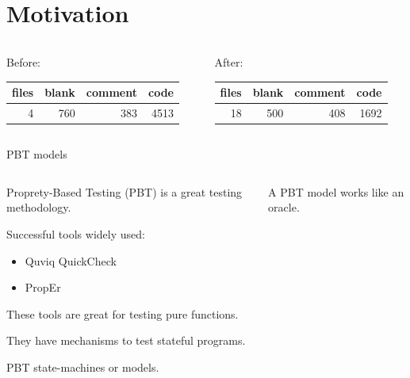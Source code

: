 \documentclass[aspectratio=169, 10pt, handout]{beamer}
\begin{document}
\whitetheme

\section{Motivation}
\label{sec:org83b7ca0}
\begin{frame}[label={sec:orgbdadd48}]{}
\begin{columns}
\begin{column}{0.38\columnwidth}
Before:
\begin{center}
\begin{tabular}{rrrr}
files & blank & comment & code\\
\hline
4 & 760 & 383 & 4513\\
\end{tabular}
\end{center}
\end{column}
\begin{column}{0.38\columnwidth}
After:
\begin{center}
\begin{tabular}{rrrr}
files & blank & comment & code\\
\hline
18 & 500 & 408 & 1692\\
\end{tabular}
\end{center}
\end{column}
\end{columns}
\end{frame}

\begin{frame}[label={sec:org3379b2c}]{PBT models}
\begin{columns}
\begin{column}{0.48\columnwidth}
\onslide<+->
\onslide<+->
Proprety-Based Testing (PBT) is a great testing methodology.

\vspace{10pt}

Successful tools widely used:
\begin{itemize}
\item Quviq QuickCheck
\item PropEr
\end{itemize}
\onslide<+->
\vspace{10pt}

These tools are great for testing pure functions.

\vspace{10pt}
\onslide<+->
They have mechanisms to test stateful programs.

\vspace{10pt}

PBT state-machines or models.
\end{column}

\begin{column}{0.48\columnwidth}
A PBT model works like an oracle.

\vspace{10pt}
\end{column}
\end{columns}
\end{frame}
\end{document}
